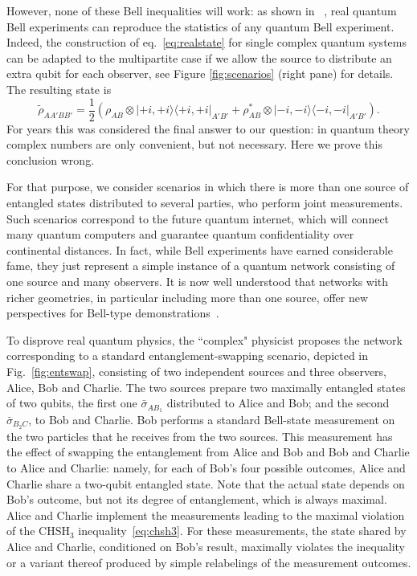 \documentclass[onecolumn,prx,amsmath,amssymb]{revtex4-2}
\def\bra#1{\langle#1|} \def\ket#1{|#1\rangle}
\def\proj#1{\ket{#1}\!\bra{#1}}
\begin{document}
However, none of these Bell inequalities will work: as shown in ~\cite{tamas_real, nicolas_real, moroder}, real quantum Bell experiments can reproduce the statistics of any quantum Bell experiment. Indeed, the construction of eq.~\eqref{eq:realstate} for single complex quantum systems can be adapted to the multipartite case if we allow the source to distribute an extra qubit for each observer, see Figure \ref{fig:scenarios} (right pane) for details. The resulting state is
\begin{equation}
\label{eq:realstateAB}
\tilde \rho_{AA'BB'} = \frac{1}{2}(\rho_{AB}\otimes\proj{+i,+i}_{A'B'} + \rho_{AB}^*\otimes\proj{-i,-i}_{A'B'}) .
\end{equation}
For years this was considered the final answer to our question: in quantum theory complex numbers are only convenient, but not necessary. Here we prove this conclusion wrong. 

For that purpose, we consider scenarios in which there is more than one source of entangled states distributed to several parties, who perform joint measurements. Such scenarios correspond to the future quantum internet, which will connect many quantum computers and guarantee quantum confidentiality over continental distances. In fact, while Bell experiments have earned considerable fame, they just represent a simple instance of a quantum network consisting of one source and many observers. It is now well understood that networks with richer geometries, in particular including more than one source, offer new perspectives for Bell-type demonstrations~\cite{bilocality,tobias1,tobias2,renouBSM,bancalBSM}. 



To disprove real quantum physics, the ``complex" physicist proposes the network corresponding to a standard entanglement-swapping scenario, depicted in Fig.~\ref{fig:entswap}, consisting of two independent sources and three observers, Alice, Bob and Charlie. The two sources prepare two maximally entangled states of two qubits, the first one $\bar{\sigma}_{AB_1}$ distributed to Alice and Bob; and the second $\bar{\sigma}_{B_2C}$, to Bob and Charlie. Bob performs a standard Bell-state measurement on the two particles that he receives from the two sources. This measurement has the effect of swapping the entanglement from Alice and Bob and Bob and Charlie to Alice and Charlie: namely, for each of Bob's four possible outcomes, Alice and Charlie share a two-qubit entangled state. Note that the actual state depends on Bob's outcome, but not its degree of entanglement, which is always maximal. Alice and Charlie implement the measurements leading to the maximal violation of the $\text{CHSH}_3$ inequality~\eqref{eq:chsh3}. For these measurements, the state shared by Alice and Charlie, conditioned on Bob's result, maximally violates the inequality or a variant thereof produced by simple relabelings of the measurement outcomes.  
\end{document}
